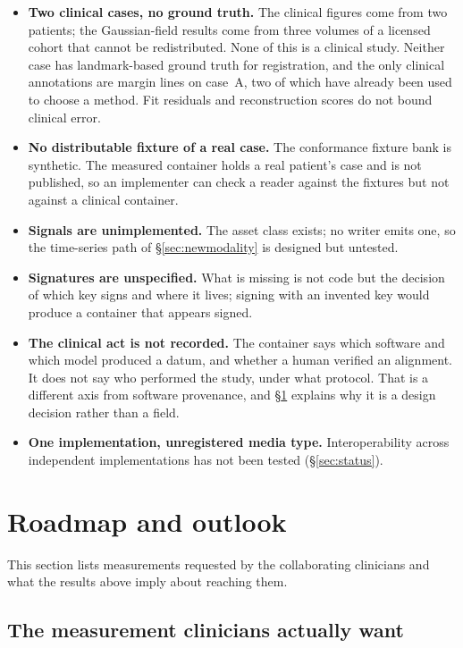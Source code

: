 \documentclass[11pt,a4paper]{article}
\begin{document}
\begin{itemize}
  \item \textbf{Two clinical cases, no ground truth.} The clinical figures come from two
  patients; the Gaussian-field results come from three volumes of a licensed cohort that
  cannot be redistributed. None of this is a clinical study. Neither case has landmark-based
  ground truth for registration, and the only clinical annotations are margin lines on
  case~A, two of which have already been used to choose a method. Fit residuals and
  reconstruction scores do not bound clinical error.
  \item \textbf{No distributable fixture of a real case.} The conformance fixture bank is
  synthetic. The measured container holds a real patient's case and is not published, so an
  implementer can check a reader against the fixtures but not against a clinical container.
  \item \textbf{Signals are unimplemented.} The asset class exists; no writer emits one, so
  the time-series path of \S\ref{sec:newmodality} is designed but untested.
  \item \textbf{Signatures are unspecified.} What is missing is not code but the decision
  of which key signs and where it lives; signing with an invented key would produce a
  container that appears signed.
  \item \textbf{The clinical act is not recorded.} The container says which software and
  which model produced a datum, and whether a human verified an alignment. It does not say
  who performed the study, under what protocol. That is a different axis from software
  provenance, and \S\ref{sec:roadmap} explains why it is a design decision rather than a
  field.
  \item \textbf{One implementation, unregistered media type.} Interoperability across
  independent implementations has not been tested (\S\ref{sec:status}).
\end{itemize}

\section{Roadmap and outlook}\label{sec:roadmap}

This section lists measurements requested by the collaborating clinicians and what the
results above imply about reaching them.

\subsection{The measurement clinicians actually want}\label{sec:rmeasure}
\end{document}
